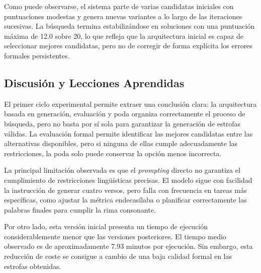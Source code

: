 \documentclass[12pt,a4paper,twoside,openright]{book}
\begin{document}
Como puede observarse, el sistema parte de varias candidatas iniciales con puntuaciones modestas y genera nuevas variantes a lo largo de las iteraciones sucesivas.
La búsqueda termina estabilizándose en soluciones con una puntuación máxima de 12.0 sobre 20,
lo que refleja que la arquitectura inicial es capaz de seleccionar mejores candidatas, pero no de corregir de forma explícita los errores formales persistentes.











\subsection{Discusión y Lecciones Aprendidas}

El primer ciclo experimental permite extraer una conclusión clara: la arquitectura basada en generación, evaluación y poda organiza correctamente el proceso de búsqueda, pero no basta por sí sola para garantizar la generación de estrofas válidas.
La evaluación formal permite identificar las mejores candidatas entre las alternativas disponibles, pero si ninguna de ellas cumple adecuadamente las restricciones, la poda solo puede conservar la opción menos incorrecta.

La principal limitación observada es que el \emph{prompting} directo no garantiza el cumplimiento de restricciones lingüísticas precisas. El modelo sigue con facilidad la instrucción de generar cuatro versos, pero falla con frecuencia en tareas más específicas,
como ajustar la métrica endecasílaba o planificar correctamente las palabras finales para cumplir la rima consonante.

Por otro lado, esta versión inicial presenta un tiempo de ejecución considerablemente menor que las versiones posteriores. El tiempo medio observado es de aproximadamente 7.93 minutos por ejecución.
Sin embargo, esta reducción de coste se consigue a cambio de una baja calidad formal en las estrofas obtenidas.
\end{document}

